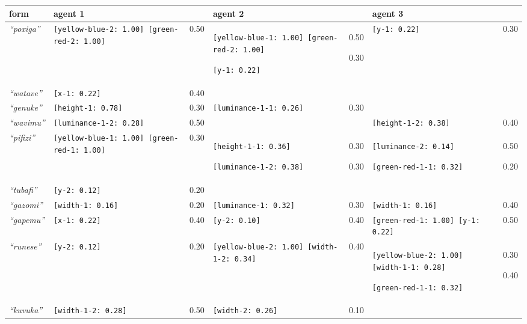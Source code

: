 
{\footnotesize\renewcommand{\arraystretch}{1.5}
\begin{tabular}{@{}p{1.3cm}|p{4.0cm}@{}p{0.8cm}@{}|p{4.0cm}@{}p{0.8cm}@{}|p{4.0cm}@{}p{0.8cm}@{}}
form & agent 1 &  & agent 2 &  & agent 3 & \\
\hline
\textit{``poxiga''}&\texttt{[yellow-blue-2: 1.00] [green-red-2: 1.00]}
&0.50&\texttt{[yellow-blue-1: 1.00] [green-red-2: 1.00]}


\texttt{[y-1: 0.22]}
&0.50

0.30&\texttt{[y-1: 0.22]}
&0.30\\
\hline
\textit{``watave''}&\texttt{[x-1: 0.22]}
&0.40&&&&\\
\hline
\textit{``genuke''}&\texttt{[height-1: 0.78]}
&0.30&\texttt{[luminance-1-1: 0.26]}
&0.30&&\\
\hline
\textit{``wavimu''}&\texttt{[luminance-1-2: 0.28]}
&0.50&&&\texttt{[height-1-2: 0.38]}
&0.40\\
\hline
\textit{``pifizi''}&\texttt{[yellow-blue-1: 1.00] [green-red-1: 1.00]}
&0.30&\texttt{[height-1-1: 0.36]}


\texttt{[luminance-1-2: 0.38]}
&0.30

0.30&\texttt{[luminance-2: 0.14]}


\texttt{[green-red-1-1: 0.32]}
&0.50

0.20\\
\hline
\textit{``tubafi''}&\texttt{[y-2: 0.12]}
&0.20&&&&\\
\hline
\textit{``gazomi''}&\texttt{[width-1: 0.16]}
&0.20&\texttt{[luminance-1: 0.32]}
&0.30&\texttt{[width-1: 0.16]}
&0.40\\
\hline
\textit{``gapemu''}&\texttt{[x-1: 0.22]}
&0.40&\texttt{[y-2: 0.10]}
&0.40&\texttt{[green-red-1: 1.00] [y-1: 0.22]}
&0.50\\
\hline
\textit{``runese''}&\texttt{[y-2: 0.12]}
&0.20&\texttt{[yellow-blue-2: 1.00] [width-1-2: 0.34]}
&0.40&\texttt{[yellow-blue-2: 1.00] [width-1-1: 0.28]}


\texttt{[green-red-1-1: 0.32]}
&0.30

0.40\\
\hline
\textit{``kuvuka''}&\texttt{[width-1-2: 0.28]}
&0.50&\texttt{[width-2: 0.26]}
&0.10&&
\end{tabular}}


